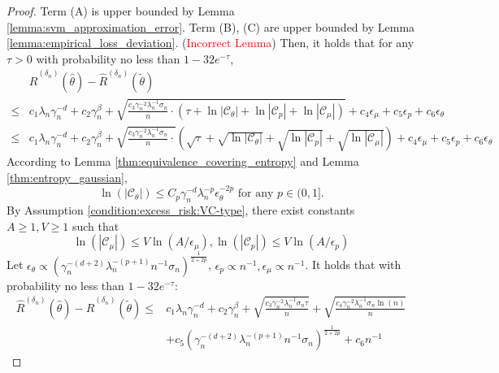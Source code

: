 \begin{proof}
Term (A) is upper bounded by Lemma \ref{lemma:svm_approximation_error}. Term (B), (C) are upper bounded by Lemma \ref{lemma:empirical_loss_deviation}. (\textcolor{red}{Incorrect Lemma})  Then, it holds that for any $\tau>0$ with probability no less than $1-32e^{-\tau}$,
\begin{align*}
   &\widehat R^{({\delta_n})}(\widehat\theta) - \widehat R^{({\delta_n})}(\tilde\theta)\\
   \leq & c_1 \lambda_n\gamma_n^{-d} + c_2\gamma_n^{\beta} + \sqrt{\frac{ c_3\gamma_n^{-2}\lambda_n^{-1}\sigma_n}{n}\cdot (\tau +\ln|\mathcal{C}_\theta|+\ln|\mathcal{C}_p|+\ln|\mathcal{C}_\mu|)} + c_4\epsilon_\mu + c_5\epsilon_p + c_6\epsilon_\theta\\
   \leq & c_1 \lambda_n\gamma_n^{-d} + c_2\gamma_n^{\beta} + \sqrt{\frac{ c_3\gamma_n^{-2}\lambda_n^{-1}\sigma_n}{n}\cdot }\left(\sqrt{\tau} +\sqrt{\ln|\mathcal{C}_\theta|}+\sqrt{\ln|\mathcal{C}_p|}+\sqrt{\ln|\mathcal{C}_\mu|}\right) + c_4\epsilon_\mu + c_5\epsilon_p + c_6\epsilon_\theta
\end{align*}
According to Lemma \ref{thm:equivalence_covering_entropy}  and Lemma \ref{thm:entropy_gaussian}, $$\ln(|\mathcal{C}_\theta|)\leq C_p\gamma_n^{-d}\lambda_n^{-p}\epsilon_\theta^{-2p}\text{ for any }p\in(0,1].$$ 
By Assumption \ref{condition:excess_risk:VC-type}, there exist constants $A\geq 1, V\geq 1$ such that $$\ln(|\mathcal{C}_\mu|)\leq V\ln\left(A/\epsilon_\mu\right),\ln(|\mathcal{C}_p|)\leq V\ln\left(A/\epsilon_p\right)$$
Let $\epsilon_\theta \propto \left(\gamma_n^{-(d+2)}\lambda_n^{-(p+1)}n^{-1}\sigma_n\right)^{\frac{1}{2+2p}}$, $\epsilon_p \propto n^{-1}, \epsilon_\mu\propto n^{-1}$. It holds that with probability no less than $1-32e^{-\tau}$:
\begin{align*}
   \widehat R^{({\delta_n})}(\widehat\theta) - \widehat R^{({\delta_n})}(\tilde\theta)\leq & c_1 \lambda_n\gamma_n^{-d} + c_2\gamma_n^{\beta}+ \sqrt{\frac{ c_3\gamma_n^{-2}\lambda_n^{-1}\sigma_n\tau}{n}} + \sqrt{\frac{ c_4\gamma_n^{-2}\lambda_n^{-1}\sigma_n\ln(n)}{n}} \\
   & + c_5\left(\gamma_n^{-(d+2)}\lambda_n^{-(p+1)}n^{-1}\sigma_n\right)^{\frac{1}{2+2p}} + c_6n^{-1}
\end{align*}



\end{proof}

